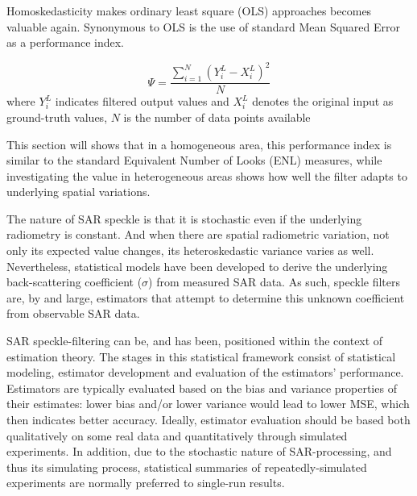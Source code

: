Homoskedasticity makes ordinary least square (OLS) approaches becomes valuable again. 
Synonymous to OLS is the use of standard Mean Squared Error as a performance index.

\begin{equation}
\Psi = \displaystyle{ \frac{ \sum^N_{i=1}{(Y^L_i - X^L_i)^2} }{N} }
\end{equation}
where $Y^L_i$ indicates filtered output values and $X^L_i$ denotes the original input as ground-truth values, $N$ is the number of data points available

This section will shows that in a homogeneous area, this performance index is similar to the standard Equivalent Number of Looks (ENL) measures, while investigating the value in heterogeneous areas shows how well the filter adapts to underlying spatial variations.


The nature of SAR speckle is that
	it is stochastic even if the underlying radiometry is constant. 
And when there are spatial radiometric variation, not only its expected value changes, its heteroskedastic variance varies as well.
Nevertheless, statistical models have been developed to derive the underlying back-scattering coefficient ($\sigma$) from measured SAR data. 
As such, speckle filters are, by and large, estimators that attempt to determine this unknown coefficient from observable SAR data. 

SAR speckle-filtering can be, and has been, positioned within the context of estimation theory\cite{Touzi_2002_TGRS}. 
The stages in this statistical framework consist of statistical modeling, estimator development and evaluation of the estimators' performance. 
Estimators are typically evaluated based on the bias and variance properties of their estimates:
  lower bias and/or lower variance would lead to lower MSE, which then indicates better accuracy.
Ideally, estimator evaluation should be based both qualitatively on some real data and quantitatively through simulated experiments. 
In addition, due to the stochastic nature of SAR-processing, and thus its simulating process, 
	statistical summaries of repeatedly-simulated experiments are normally preferred to single-run results.

